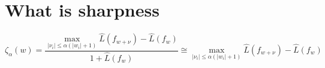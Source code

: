 
\section{What is sharpness}

\begin{equation}
\zeta _\alpha (w) = \frac{\max_{\left| \nu_i \right| \le \alpha(\left| w_i  \right| + 1) }\hat{L}(f_{w + \nu}) - \hat{L}(f_w)}{1 + \hat{L}(f_w)} \cong \max_{\left| \nu_i \right| \le \alpha(\left| w_i  \right| + 1) }\hat{L}(f_{w + \nu}) - \hat{L}(f_w)
\end{equation}